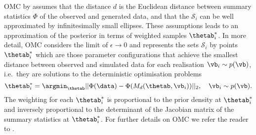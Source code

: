 OMC by \citet{Meeds2015} assumes that the distance $d$ is the
Euclidean distance between summary statistics $\Phi$ of the observed
and generated data, and that the $\mathcal{S}_i$ can be well
approximated by infinitesimally small ellipses. These assumptions
leads to an approximation of the posterior in terms of weighted
samples $\thetab_i^*$. In more detail, OMC considers the limit of
$\epsilon \to 0$ and represents the sets $\mathcal{S}_i$ by points
$\thetab_i^*$ which are those parameter configurations that achieve
the smallest distance between observed and simulated data for each
realisation $\vb_i \sim p(\vb)$, i.e.\ they are solutions to the
deterministic optimisation problems
\begin{equation}
\thetab_i^* = \argmin_{\thetab} ||\Phi(\data)-\Phi(M_d(\thetab, \vb_i))||_2  , \quad \vb_i \sim p(\vb).
\end{equation}
The weighting for each $\thetab_i^*$ is proportional to the prior
density at $\thetab_i^*$ and inversely proportional to the determinant
of the Jacobian matrix of the summary statistics at $\thetab_i^*$. For
further details on OMC we refer the reader to \citep{Meeds2015,
Ikonomov2019}.

